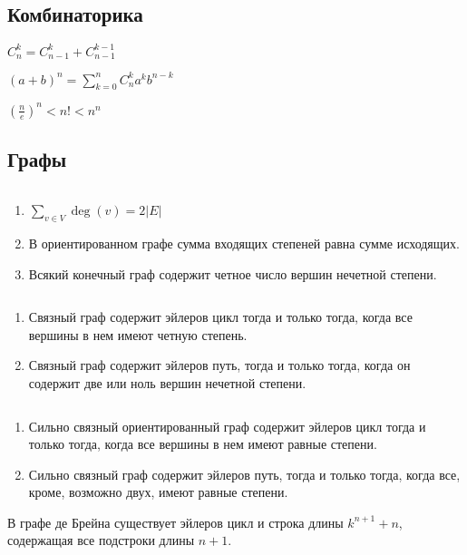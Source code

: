 \documentclass[12pt]{article}
\begin{document}
\subsection{Комбинаторика}
\begin{st}
    $C_n^k = C_{n-1}^k + C_{n-1}^{k-1}$
\end{st}
\begin{st}
$(a+b)^n = \sum\limits_{k = 0}^{n} C_n^k a^k b ^{n-k}$
\end{st}
\begin{thm}
    $
    \left ( \frac{n}{e} \right )^n < n! < n^n$
\end{thm}

\subsection{Графы}
\begin{lm}$ $
    \begin{enumerate}
	\item $\sum\limits_{v \in  V} \deg(v) =  2 |E|$
	\item В ориентированном графе сумма входящих степеней равна сумме исходящих.
	\item Всякий конечный граф содержит четное число вершин нечетной степени.
    \end{enumerate}
\end{lm}
\begin{thm}$ $
    \begin{enumerate}
	\item Связный граф содержит эйлеров цикл тогда и только тогда, когда все вершины в нем имеют четную степень.
	\item Связный граф содержит эйлеров путь, тогда и только тогда, когда он содержит две или ноль вершин нечетной степени.
    \end{enumerate}
\end{thm}
\begin{thm}$ $
    \begin{enumerate}
	\item Сильно связный  ориентированный граф содержит эйлеров цикл тогда и только тогда, когда все вершины в нем имеют равные степени.
	\item Сильно связный граф содержит эйлеров путь, тогда и только тогда, когда все, кроме, возможно двух, имеют равные степени.
    \end{enumerate}
\end{thm}
\begin{thm}
    В графе де Брейна существует эйлеров цикл и строка длины $k^{n+1} + n$, содержащая все подстроки длины $n+1$.
\end{thm}
\end{document}
